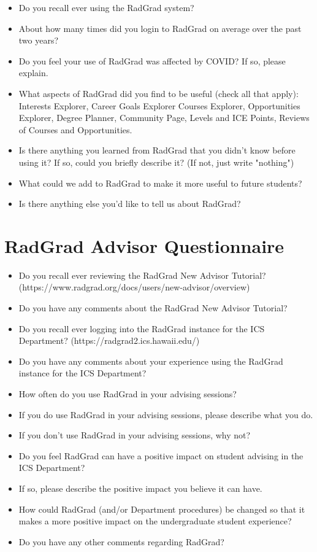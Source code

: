 \documentclass[acmsmall]{acmart}
\begin{document}
\begin{itemize}
\item Do you recall ever using the RadGrad system?
\item About how many times did you login to RadGrad on average over the past two years?
\item Do you feel your use of RadGrad was affected by COVID? If so, please explain.
\item What aspects of RadGrad did you find to be useful (check all that apply): Interests Explorer, Career Goals Explorer Courses Explorer, Opportunities Explorer, Degree Planner, Community Page, Levels and ICE Points, Reviews of Courses and Opportunities.
\item Is there anything you learned from RadGrad that you didn't know before using it? If so, could you briefly describe it? (If not, just write "nothing")
\item What could we add to RadGrad to make it more useful to future students?
\item Is there anything else you'd like to tell us about RadGrad?
\end{itemize}

\section{RadGrad Advisor Questionnaire}
\label{sec:advisor-questionnaire}

\begin{itemize}
\item Do you recall ever reviewing the RadGrad New Advisor Tutorial? \newline (https://www.radgrad.org/docs/users/new-advisor/overview)
\item Do you have any comments about the RadGrad New Advisor Tutorial?
\item Do you recall ever logging into the RadGrad instance for the ICS Department? \newline (https://radgrad2.ics.hawaii.edu/)
\item Do you have any comments about your experience using the RadGrad instance for the ICS Department?
\item How often do you use RadGrad in your advising sessions?
\item If you do use RadGrad in your advising sessions, please describe what you do.
\item If you don't use RadGrad in your advising sessions, why not?
\item Do you feel RadGrad can have a positive impact on student advising in the ICS Department?
\item If so, please describe the positive impact you believe it can have.
\item How could RadGrad (and/or Department procedures) be changed so that it makes a more positive impact on the undergraduate student experience?
\item Do you have any other comments regarding RadGrad?
\end{itemize}
\end{document}
